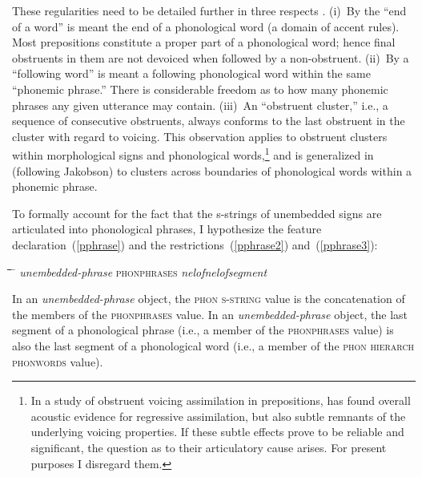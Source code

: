 \documentclass[output=paper]{langsci/langscibook}
\begin{document}
These regularities need to be detailed further in three respects
\citep[63f.]{hall:59}. (i)~By the
``end of a word'' is meant the end of a phonological word (a domain of
accent rules). Most prepositions constitute a proper part of a phonological
word; hence final obstruents in them are not devoiced when followed by a
non-obstruent. (ii)~By a ``following word'' is meant a following
phonological word within the same ``phonemic phrase.''  There is
considerable freedom as to how many phonemic phrases any given utterance
may contain. (iii)~An ``obstruent cluster,'' i.e., a sequence of
consecutive obstruents, always conforms to the last obstruent in the
cluster with regard to voicing. This observation applies to obstruent
clusters within morphological signs and phonological words,\footnote{%
	In a study of obstruent voicing assimilation in prepositions,
  \cite{bur:rob:97} has found
  overall acoustic evidence for regressive assimilation, but also subtle
  remnants of the underlying voicing properties. If these subtle effects
  prove to be reliable and significant, the question as to their
  articulatory cause arises. For present purposes I disregard them.%
}
and is generalized in \cite[64]{hall:59} (following Jakobson)
to clusters across boundaries of phonological words within a phonemic
phrase.

To formally account for the fact that the s-strings of unembedded signs are
articulated into phonological phrases, I hypothesize the feature
declaration~(\ref{pphrase}) and the restrictions~(\ref{pphrase2}) and~(\ref{pphrase3}):
\begin{exe}
\ex
\label{pphrase}
\begin{tabbing}
\hspace{1,5em}\=\hspace{1,5em}\=\hspace{1,5em}\=\hspace{1,5em}\=\hspace{6em}
\=\kill
\textit{unembedded-phrase}         \>\>\>\>\>\textsc{phonphrases} \textit{nelofnelofsegment}
\end{tabbing}
\ex
\label{pphrase2} In an \textit{unembedded-phrase} object, the
  \textsc{phon s-string} value is the concatenation of the members of the \textsc{phonphrases} value.
\ex
\label{pphrase3} In an \textit{unembedded-phrase}\/ object, the
  last segment of a phonological phrase (i.e., a member of the \textsc{phonphrases} value) is also the last segment of a phonological word
  (i.e., a member of the \textsc{phon hierarch phonwords} value).
\end{exe}
\end{document}
